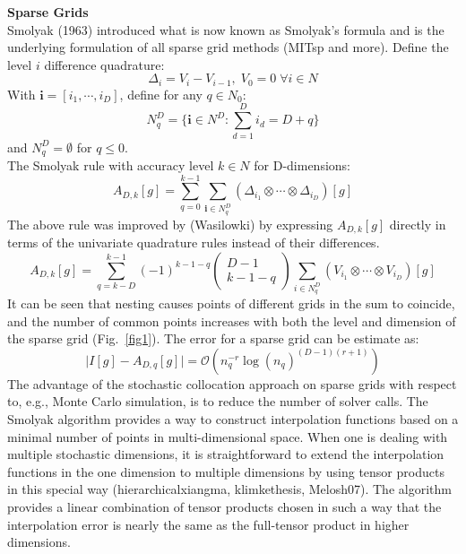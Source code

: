 \documentclass{article}
\begin{document}
 \textbf{Sparse Grids}\\
 Smolyak (1963) introduced what is now known as Smolyak's formula and is the underlying formulation
 of all sparse grid methods (MITsp and more). Define the level $i$ difference quadrature:
 \begin{equation}
\Delta_i = V_i - V_{i-1},  \; V_0 = 0 \; \forall i \in N
\end{equation}
With $\textbf{i} = [i_1, \cdots, i_D]$, define for any $q \in N_0$:
 \begin{equation}
N_q^D = \lbrace \textbf{i} \in N^D : \sum_{d=1}^{D} i_d=D + q \rbrace 
\end{equation}
and $N_{q}^D = \emptyset$ for $q \le 0$. \\
 The Smolyak rule with accuracy level $k \in N$ for D-dimensions:
 \begin{equation}
A_{D,k}[g] = \sum_{q=0}^{k-1}\sum_{\textbf{i}\in N_{q}^D} (\Delta_{i_1} \otimes \cdots \otimes \Delta_{i_D})[g]
\end{equation}
The above rule was improved by (Wasilowki) by expressing $A_{D,k}[g]$ directly
in terms of the univariate quadrature rules instead of their differences.
\begin{equation}
A_{D,k}[g] = \sum_{q=k-D}^{k-1}(-1)^{k-1-q}\begin{pmatrix}D-1 \\ k-1-q \end{pmatrix}
\sum_{i \in N_q^D}(V_{i_1} \otimes \cdots \otimes V_{i_D})[g]
\end{equation}
 It can be seen that nesting causes points of different grids in the sum to coincide, and the number of
 common points increases with both the level and dimension of the sparse grid (Fig.~\ref{fig1}).
 The error for a sparse grid can be estimate as:
 \begin{equation}
\lvert I[g] -A_{D,q}[g] \rvert = \mathcal{O}(n_{q}^{-r}\log(n_q)^{(D-1)(r+1)})
\end{equation}
 The advantage of the stochastic collocation approach on sparse grids with respect to, e.g., Monte Carlo 
 simulation, is to reduce the number of solver calls.
 The Smolyak algorithm provides a way to construct interpolation functions based on a minimal number
 of points in multi-dimensional space. When one is dealing with multiple stochastic dimensions, it is 
 straightforward to extend the interpolation functions in the one dimension to multiple dimensions by 
 using tensor products in this special way (hierarchicalxiangma, klimkethesis, Melosh07). The algorithm 
 provides a linear combination of tensor products chosen in such a way that the interpolation error is 
 nearly the same as the full-tensor product in higher dimensions. 
\end{document}

